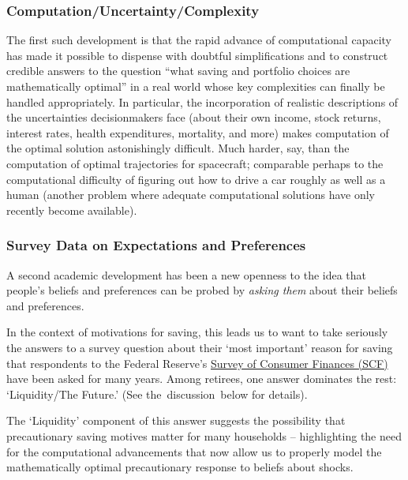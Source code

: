 \documentclass{article}
\begin{document}
\subsubsection{Computation/Uncertainty/Complexity}

The first such development is that the rapid advance of computational capacity has made it possible to dispense with doubtful simplifications and to construct credible answers to the question ``what saving and portfolio choices are mathematically optimal'' in a real world whose key complexities can finally be handled appropriately. In particular, the incorporation of realistic descriptions of the uncertainties decisionmakers face (about their own income, stock returns, interest rates, health expenditures, mortality, and more) makes computation of the optimal solution astonishingly difficult. Much harder, say, than the computation of optimal trajectories for spacecraft; comparable perhaps to the computational difficulty of figuring out how to drive a car roughly as well as a human (another problem where adequate computational solutions have only recently become available).


\subsubsection{Survey Data on Expectations and Preferences}

A second academic development has been a new openness to the idea that people's beliefs and preferences can be probed by \textit{asking them} about their beliefs and preferences.

In the context of motivations for saving, this leads us to want to take seriously the answers to a survey question about their `most important' reason for saving that respondents to the Federal Reserve's \href{https://www.federalreserve.gov/econres/scfindex.htm}{Survey of Consumer Finances (SCF)} have been asked for many years. Among retirees, one answer dominates the rest: `Liquidity/The Future.'  (See the~discussion~below for details).

The `Liquidity' component of this answer suggests the possibility that precautionary saving motives matter for many households -- highlighting the need for the computational advancements that now allow us to properly model the mathematically optimal precautionary response to beliefs about shocks.

\end{document}
